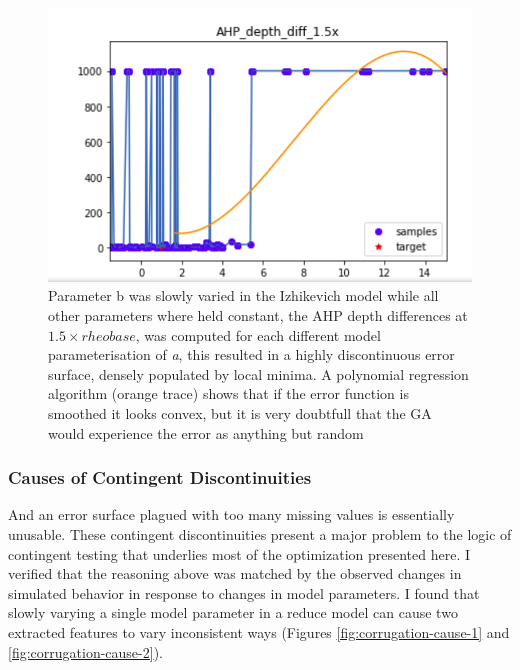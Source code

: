 \begin{figure}
      \centering
      \includegraphics[scale=0.85]{figures/parameter_b_hopeless_surface2.png}
      \caption[Cross section of difficult or hopeless error surface]{Parameter b was slowly varied in the Izhikevich model while all other parameters where held constant, the AHP depth differences at $1.5 \times rheobase$, was computed for each different model parameterisation of \emph{a}, this resulted in a highly  discontinuous error surface, densely populated by local minima. A polynomial regression algorithm (orange trace) shows that if the error function is smoothed it looks convex, but it is very doubtfull that the GA would experience the error as anything but random}
      \label{fig:discontinuous_constraint}
\end{figure}

\subsubsection{Causes of Contingent Discontinuities}
And an error surface plagued with too many missing values is essentially unusable.
These contingent discontinuities present a major problem to the logic of contingent testing that underlies most of the optimization presented here.
I verified that the reasoning above was matched by the observed changes in simulated behavior in response to changes in model parameters.
I found that slowly varying a single model parameter in a reduce model can cause two extracted features to vary inconsistent ways (Figures \ref{fig:corrugation-cause-1} and \ref{fig:corrugation-cause-2}).

